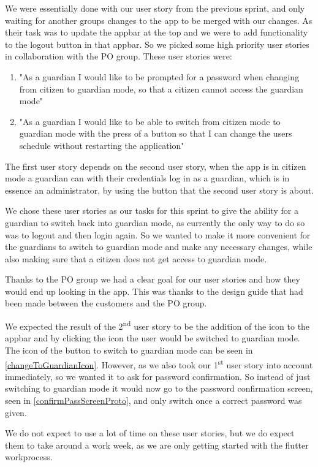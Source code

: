 We were essentially done with our user story from the previous sprint, and only waiting for another groups changes to the app to be merged with our changes. 
As their task was to update the appbar at the top and we were to add functionality to the logout button in that appbar.
So we picked some high priority user stories in collaboration with the PO group.
These user stories were:

\begin{enumerate}
\item "As a guardian I would like to be prompted for a password when changing from citizen to guardian mode, so that a citizen cannot access the guardian mode"
\item "As a guardian I would like to be able to switch from citizen mode to guardian mode with the press of a button so that I can change the users schedule without restarting the application"
\end{enumerate}

The first user story depends on the second user story, when the app is in citizen mode a guardian can with their credentials log in as a guardian, which is in essence an administrator, by using the button that the second user story is about. 

We chose these user stories as our tasks for this sprint to give the ability for a guardian to switch back into guardian mode, as currently the only way to do so was to logout and then login again. 
So we wanted to make it more convenient for the guardians to switch to guardian mode and make any necessary changes, while also making sure that a citizen does not get access to guardian mode.

Thanks to the PO group we had a clear goal for our user stories and how they would end up looking in the app. 
This was thanks to the design guide that had been made between the customers and the PO group.

We expected the result of the 2\textsuperscript{nd} user story to be the addition of the icon to the appbar and by clicking the icon the user would be switched to guardian mode. 
The icon of the button to switch to guardian mode can be seen in \autoref{changeToGuardianIcon}.
However, as we also took our 1\textsuperscript{st} user story into account immediately, so we wanted it to ask for password confirmation. 
So instead of just switching to guardian mode it would now go to the password confirmation screen, seen in \autoref{confirmPassScreenProto}, and only switch once a correct password was given.


We do not expect to use a lot of time on these user stories, but we do expect them to take around a work week, as we are only getting started with the flutter workprocess.
